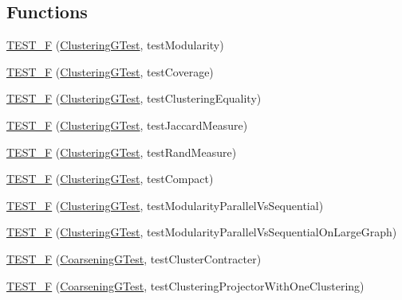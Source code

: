 \subsection*{Functions}
\begin{DoxyCompactItemize}
\item 
\hyperlink{namespace_networ_kit_ae7329d30d6284a0d4aee6045ad5fa91a}{T\-E\-S\-T\-\_\-\-F} (\hyperlink{class_networ_kit_1_1_clustering_g_test}{Clustering\-G\-Test}, test\-Modularity)
\item 
\hyperlink{namespace_networ_kit_a71dcdd3a5c7565c91853184aa9f55f42}{T\-E\-S\-T\-\_\-\-F} (\hyperlink{class_networ_kit_1_1_clustering_g_test}{Clustering\-G\-Test}, test\-Coverage)
\item 
\hyperlink{namespace_networ_kit_afe44bdb419de446e1d0b18cc54dd356a}{T\-E\-S\-T\-\_\-\-F} (\hyperlink{class_networ_kit_1_1_clustering_g_test}{Clustering\-G\-Test}, test\-Clustering\-Equality)
\item 
\hyperlink{namespace_networ_kit_a0a7b4a1fa32e5f373fd606be55d76f54}{T\-E\-S\-T\-\_\-\-F} (\hyperlink{class_networ_kit_1_1_clustering_g_test}{Clustering\-G\-Test}, test\-Jaccard\-Measure)
\item 
\hyperlink{namespace_networ_kit_a86c03d497c783a835a6ac43496c63b9b}{T\-E\-S\-T\-\_\-\-F} (\hyperlink{class_networ_kit_1_1_clustering_g_test}{Clustering\-G\-Test}, test\-Rand\-Measure)
\item 
\hyperlink{namespace_networ_kit_a5ac06aed48bc1e0ccca80504a00bf25d}{T\-E\-S\-T\-\_\-\-F} (\hyperlink{class_networ_kit_1_1_clustering_g_test}{Clustering\-G\-Test}, test\-Compact)
\item 
\hyperlink{namespace_networ_kit_a0355e2081537a2ab8a0cb849ed547478}{T\-E\-S\-T\-\_\-\-F} (\hyperlink{class_networ_kit_1_1_clustering_g_test}{Clustering\-G\-Test}, test\-Modularity\-Parallel\-Vs\-Sequential)
\item 
\hyperlink{namespace_networ_kit_a7f576cca17b3672569dc730e88ee034c}{T\-E\-S\-T\-\_\-\-F} (\hyperlink{class_networ_kit_1_1_clustering_g_test}{Clustering\-G\-Test}, test\-Modularity\-Parallel\-Vs\-Sequential\-On\-Large\-Graph)
\item 
\hyperlink{namespace_networ_kit_af9839fafa3ea33c533ac5c910de4d716}{T\-E\-S\-T\-\_\-\-F} (\hyperlink{class_networ_kit_1_1_coarsening_g_test}{Coarsening\-G\-Test}, test\-Cluster\-Contracter)
\item 
\hyperlink{namespace_networ_kit_aaefe3f4226eaaaa054c4e13b26822edd}{T\-E\-S\-T\-\_\-\-F} (\hyperlink{class_networ_kit_1_1_coarsening_g_test}{Coarsening\-G\-Test}, test\-Clustering\-Projector\-With\-One\-Clustering)

\end{DoxyCompactItemize}
